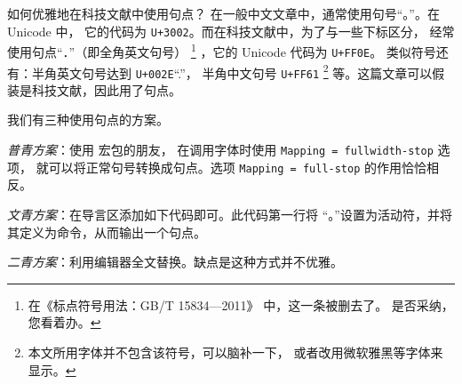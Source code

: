 \begin{myQA}{如何优雅地在科技文献中使用句点？}
	在一般中文文章中，通常使用句号“{。}”。在 Unicode 中，
	它的代码为 \verb|U+3002|。而在科技文献中，为了与一些下标区分，
	经常使用句点“．”（即全角英文句号）
	\footnote{在《标点符号用法：GB/T 15834—2011》 中，这一条被删去了。
		是否采纳，您看着办。}
	，它的 Unicode 代码为 \verb|U+FF0E|。
	类似符号还有：半角英文句号达到 \verb|U+002E|“.”，
	半角中文句号 \verb|U+FF61|
	\footnote{本文所用字体并不包含该符号，可以脑补一下，
		或者改用微软雅黑等字体来显示。}
	等。这篇文章可以假装是科技文献，因此用了句点。
	
	我们有三种使用句点的方案。
	
	\emph{普青方案}：使用   宏包的朋友，
	在调用字体时使用
	\verb|Mapping = fullwidth-stop|  选项，
	就可以将正常句号转换成句点。选项 \verb|Mapping = full-stop|
	的作用恰恰相反。
	
	\emph{文青方案}：在导言区添加如下代码即可。此代码第一行将
	“{。}”设置为活动符，并将其定义为命令，从而输出一个句点。
	 
	
	\emph{二青方案}：利用编辑器全文替换。缺点是这种方式并不优雅。
	
	\nocite{*}
\end{myQA}

